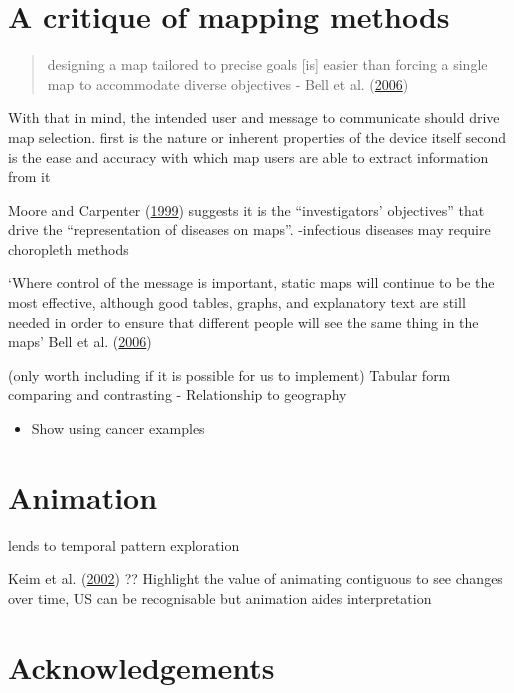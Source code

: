 \documentclass[11pt,]{article}
\providecommand{\tightlist}{%
  \setlength{\itemsep}{0pt}\setlength{\parskip}{0pt}}
\begin{document}
\hypertarget{a-critique-of-mapping-methods}{%
\section{A critique of mapping
methods}\label{a-critique-of-mapping-methods}}

\begin{quote}
designing a map tailored to precise goals {[}is{]} easier than forcing a
single map to accommodate diverse objectives - Bell et al.
(\protect\hyperlink{ref-CPISACA}{2006})
\end{quote}

With that in mind, the intended user and message to communicate should
drive map selection. first is the nature or inherent properties of the
device itself second is the ease and accuracy with which map users are
able to extract information from it

Moore and Carpenter (\protect\hyperlink{ref-SAMGIS}{1999}) suggests it
is the ``investigators' objectives'' that drive the ``representation of
diseases on maps''. -infectious diseases may require choropleth methods

`Where control of the message is important, static maps will continue to
be the most effective, although good tables, graphs, and explanatory
text are still needed in order to ensure that different people will see
the same thing in the maps' Bell et al.
(\protect\hyperlink{ref-CPISACA}{2006})

(only worth including if it is possible for us to implement) Tabular
form comparing and contrasting - Relationship to geography

\begin{itemize}
\tightlist
\item
  Show using cancer examples
\end{itemize}

\hypertarget{animation}{%
\section{Animation}\label{animation}}

lends to temporal pattern exploration

Keim et al. (\protect\hyperlink{ref-ECGC}{2002}) ?? Highlight the value
of animating contiguous to see changes over time, US can be recognisable
but animation aides interpretation

\hypertarget{acknowledgements}{%
\section{Acknowledgements}\label{acknowledgements}}
\end{document}
